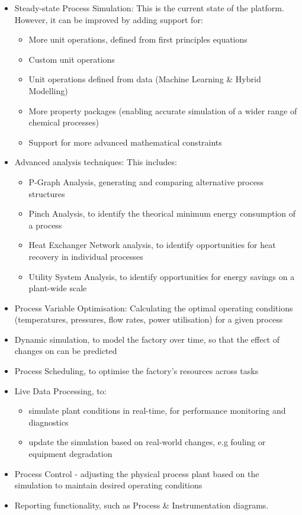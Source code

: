 \documentclass[12pt]{report}
\begin{document}
\begin{itemize}
    \item Steady-state Process Simulation: This is the current state of the platform. However, it can be improved by adding support for:
          \begin{itemize}
              \item More unit operations, defined from first principles equations
              \item Custom unit operations
              \item Unit operations defined from data (Machine Learning \& Hybrid Modelling)
              \item More property packages (enabling accurate simulation of a wider range of chemical processes)
              \item Support for more advanced mathematical constraints
          \end{itemize}
    \item Advanced analysis techniques: This includes:
          \begin{itemize}
              \item P-Graph Analysis, generating and comparing alternative process structures
              \item Pinch Analysis, to identify the theorical minimum energy consumption of a process
              \item Heat Exchanger Network analysis, to identify opportunities for heat recovery in individual processes
              \item Utility System Analysis, to identify opportunities for energy savings on a plant-wide scale
          \end{itemize}
    \item Process Variable Optimisation: Calculating the optimal operating conditions (temperatures, pressures, flow rates, power utilisation) for a given process
    \item Dynamic simulation, to model the factory over time, so that the effect of changes on can be predicted
    \item Process Scheduling, to optimise the factory's resources across tasks
    \item Live Data Processing, to:
          \begin{itemize}
              \item simulate plant conditions in real-time, for performance monitoring and diagnostics
              \item update the simulation based on real-world changes, e.g fouling or equipment degradation
          \end{itemize}
    \item Process Control - adjusting the physical process plant based on the simulation to maintain desired operating conditions
    \item Reporting functionality, such as Process \& Instrumentation diagrams.
\end{itemize}
\end{document}

